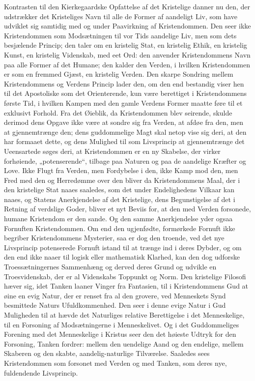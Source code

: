 \documentclass[12pt,a4paper,openany]{book}
\newcommand{\opage}[1]{\marginnote{\footnotesize\textit{[#1]}}}
\begin{document}
Kontrasten til den Kierkegaardske Opfattelse af det Kristelige
danner nu den, der udstrækker det Kristeliges Navn til
alle de Former af aandeligt Liv, som have udviklet sig samtidig
med og under Paavirkning af Kristendommen. Den
seer ikke Kristendommen som Modsætningen til vor Tids
aandelige Liv, men som dets besjælende Princip; den taler
om en kristelig Stat, en kristelig Ethik, en kristelig Kunst,
en kristelig Videnskab, med eet Ord: den anvender Kristendommens
Navn paa alle Former af det Humane; den kalder
den Verden, i hvilken Kristendommen er som en fremmed
Gjæst, en kristelig Verden. Den skarpe Sondring mellem
Kristendommens og Verdens Princip lader den, om den end
bestandig viser hen til det Apostoliske som det Orienterende,
kun være berettiget i Kristendommens første Tid, i hvilken
Kampen med den gamle Verdens Former maatte føre til et
exklusivt Forhold. Fra det Øieblik, da Kristendommen blev
seirende, skulde derimod dens Opgave ikke være at sondre
sig fra Verden, at afdøe fra den, men at gjennemtrænge
den; dens guddommelige Magt skal netop vise sig deri, at
den har formaaet dette, og dens Mulighed til som Livsprincip
at gjennemtrænge det Ueensartede søges deri, at Kristendommen
er en ny Skabelse, der virker forhøiende, „potenserende“,
tilbage paa Naturen og paa de aandelige Kræfter og
Love. Ikke Flugt fra Verden, men Fordybelse i den, ikke
Kamp mod den, men Fred med den og Herredømme over
den bliver da Kristendommens Maal, der i den kristelige Stat
naaes saaledes, som det under Endelighedens Vilkaar kan
naaes, og Statens Anerkjendelse af det Kristelige, dens Begunstigelse
af det i Retning af verdslige Goder, bliver et nyt
Beviis for, at den med Verden forsonede, humane Kristendom
er den sande. Og den samme Anerkjendelse yder ogsaa
\opage{439}Fornuften Kristendommen. Om end den ugjenfødte, formørkede
Fornuft ikke begriber Kristendommens Mysterier, saa er
dog den troende, ved det nye Livsprincip potenserede Fornuft
istand til at trænge ind i deres Dybder, og om den end ikke
naaer til logisk eller mathematisk Klarhed, kan den dog udforske
Troessætningernes Sammenhæng og derved deres
Grund og udvikle en Troesvidenskab, der er al Videnskabs
Toppunkt og Norm. Den kristelige Filosofi hæver sig, idet
Tanken laaner Vinger fra Fantasien, til i Kristendommens
Gud at øine en evig Natur, der er renset fra al den grovere,
ved Menneskets Synd besmittede Naturs Ufuldkommenhed.
Den seer i denne evige Natur i Gud Muligheden til at
hævde det Naturliges relative Berettigelse i det Menneskelige,
til en Forsoning af Modsætningerne i Menneskelivet. Og
i det Guddommeliges Forening med det Menneskelige i
Kristus seer den det høieste Udtryk for den Forsoning, Tanken
fordrer: mellem den uendelige Aand og den endelige, mellem
Skaberen og den skabte, aandelig-naturlige Tilværelse. Saaledes
sees Kristendommen som forsonet med Verden og med
Tanken, som deres nye, fuldendende Livsprincip.
\end{document}
